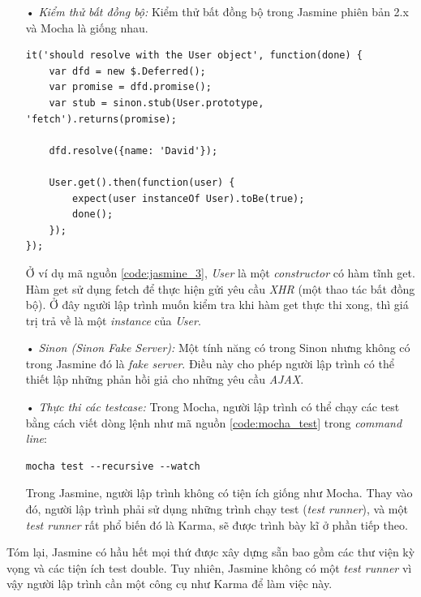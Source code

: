 \documentclass[12pt,a4paper,twoside]{article}
\begin{document}
\begin{itemize}
\item[•] \emph{Kiểm thử bất đồng bộ:}
Kiểm thử bất đồng bộ trong Jasmine phiên bản \textsf{2.x} và Mocha là giống nhau.

\begin{lstlisting}[caption=Ví dụ sử dụng Jasmine để kiểm thử bất đồng bộ,label={code:jasmine_3}]
it('should resolve with the User object', function(done) {
	var dfd = new $.Deferred();
	var promise = dfd.promise();
	var stub = sinon.stub(User.prototype, 'fetch').returns(promise);
	
	dfd.resolve({name: 'David'});
	
	User.get().then(function(user) {
		expect(user instanceOf User).toBe(true);
		done();
	});
});
\end{lstlisting}

Ở ví dụ mã nguồn \ref{code:jasmine_3}, \textit{User} là một \textit{constructor} có hàm tĩnh \textsf{get}. Hàm \textsf{get} sử dụng \textsf{fetch} để thực hiện gửi yêu cầu \textit{XHR} (một thao tác bất đồng bộ). Ở đây người lập trình muốn kiểm tra khi hàm \textsf{get} thực thi xong, thì giá trị trả về là một \textit{instance} của \textit{User}.

\item[•] \emph{Sinon (Sinon Fake Server):}
Một tính năng có trong Sinon nhưng không có trong Jasmine đó là \textit{fake server}. Điều này cho phép người lập trình có thể thiết lập những phản hồi giả cho những yêu cầu \textit{AJAX}.

\item[•] \emph{Thực thi các testcase:}
Trong Mocha, người lập trình có thể chạy các test bằng cách viết dòng lệnh như mã nguồn \ref{code:mocha_test} trong \textit{command line}:

\begin{lstlisting}[caption=Khởi chạy trình kiểm thử testcase với Mocha,label={code:mocha_test}]
mocha test --recursive --watch
\end{lstlisting}

Trong Jasmine, người lập trình không có tiện ích giống như Mocha. Thay vào đó, người lập trình phải sử dụng những trình chạy test (\textit{test runner}), và một \textit{test runner} rất phổ biến đó là Karma, sẽ được trình bày kĩ ở phần tiếp theo.
\end{itemize}

Tóm lại, Jasmine có hầu hết mọi thứ được xây dựng sẵn bao gồm các thư viện kỳ vọng và các tiện ích test double. Tuy nhiên, Jasmine không có một \textit{test runner} vì vậy người lập trình cần một công cụ như Karma để làm việc này.
\end{document}
